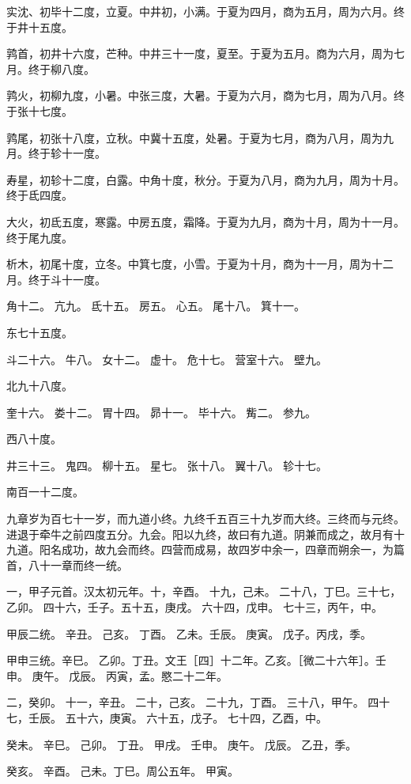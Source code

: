 \documentclass[]{article}
\begin{document}
实沈、初毕十二度，立夏。中井初，小满。于夏为四月，商为五月，周为六月。终于井十五度。

鹑首，初井十六度，芒种。中井三十一度，夏至。于夏为五月。商为六月，周为七月。终于柳八度。

鹑火，初柳九度，小暑。中张三度，大暑。于夏为六月，商为七月，周为八月。终于张十七度。

鹑尾，初张十八度，立秋。中冀十五度，处暑。于夏为七月，商为八月，周为九月。终于轸十一度。

寿星，初轸十二度，白露。中角十度，秋分。于夏为八月，商为九月，周为十月。终于氐四度。

大火，初氐五度，寒露。中房五度，霜降。于夏为九月，商为十月，周为十一月。终于尾九度。

析木，初尾十度，立冬。中箕七度，小雪。于夏为十月，商为十一月，周为十二月。终于斗十一度。

角十二。 亢九。 氐十五。 房五。 心五。 尾十八。 箕十一。

东七十五度。

斗二十六。 牛八。 女十二。 虚十。 危十七。 营室十六。 壁九。

北九十八度。

奎十六。 娄十二。 胃十四。 昴十一。 毕十六。 觜二。 参九。

西八十度。

井三十三。 鬼四。 柳十五。 星七。 张十八。 翼十八。 轸十七。

南百一十二度。

九章岁为百七十一岁，而九道小终。九终千五百三十九岁而大终。三终而与元终。进退于牵牛之前四度五分。九会。阳以九终，故曰有九道。阴兼而成之，故月有十九道。阳名成功，故九会而终。四营而成易，故四岁中余一，四章而朔余一，为篇首，八十一章而终一统。

一，甲子元首。汉太初元年。十，辛酉。 十九，己未。
二十八，丁巳。三十七，乙卯。 四十六，壬子。五十五，庚戌。 六十四，戊申。
七十三，丙午，中。

甲辰二统。 辛丑。 己亥。 丁酉。 乙未。壬辰。 庚寅。 戊子。丙戌，季。

甲申三统。辛巳。
乙卯。丁丑。文王［四］十二年。乙亥。［微二十六年］。壬申。 庚午。 戊辰。
丙寅，孟。愍二十二年。

二，癸卯。 十一，辛丑。 二十，己亥。 二十九，丁酉。 三十八，甲午。
四十七，壬辰。 五十六，庚寅。 六十五，戊子。 七十四，乙酉，中。

癸未。 辛巳。 己卯。 丁丑。 甲戌。 壬申。 庚午。 戊辰。 乙丑，季。

癸亥。 辛酉。 己未。丁巳。周公五年。 甲寅。
\end{document}
